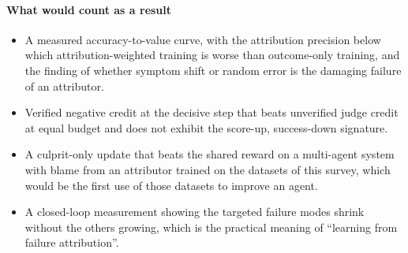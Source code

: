 \paragraph{What would count as a result}
\begin{itemize}[leftmargin=1.1em]
\item A measured accuracy-to-value curve, with the attribution precision below which attribution-weighted training is worse than outcome-only training, and the finding of whether symptom shift or random error is the damaging failure of an attributor.
\item Verified negative credit at the decisive step that beats unverified judge credit at equal budget and does not exhibit the score-up, success-down signature.
\item A culprit-only update that beats the shared reward on a multi-agent system with blame from an attributor trained on the datasets of this survey, which would be the first use of those datasets to improve an agent.
\item A closed-loop measurement showing the targeted failure modes shrink without the others growing, which is the practical meaning of ``learning from failure attribution''.
\end{itemize}
